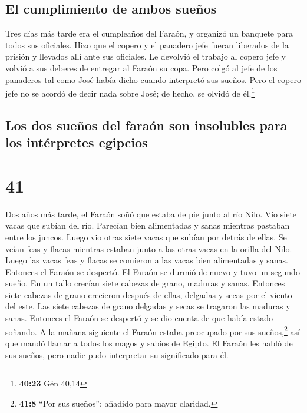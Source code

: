 \hypertarget{el-cumplimiento-de-ambos-sueuxf1os}{%
\subsection{El cumplimiento de ambos
sueños}\label{el-cumplimiento-de-ambos-sueuxf1os}}

 Tres días más tarde era el cumpleaños del Faraón, y
organizó un banquete para todos sus oficiales. Hizo que el copero y el
panadero jefe fueran liberados de la prisión y llevados allí ante sus
oficiales.  Le devolvió el trabajo al copero jefe y
volvió a sus deberes de entregar al Faraón su copa.  Pero
colgó al jefe de los panaderos tal como José había dicho cuando
interpretó sus sueños.  Pero el copero jefe no se acordó
de decir nada sobre José; de hecho, se olvidó de él.\footnote{\textbf{40:23}
  Gén 40,14}

\hypertarget{los-dos-sueuxf1os-del-farauxf3n-son-insolubles-para-los-intuxe9rpretes-egipcios}{%
\subsection{Los dos sueños del faraón son insolubles para los
intérpretes
egipcios}\label{los-dos-sueuxf1os-del-farauxf3n-son-insolubles-para-los-intuxe9rpretes-egipcios}}

\hypertarget{section-40}{%
\section{41}\label{section-40}}

 Dos años más tarde, el Faraón soñó que estaba de pie
junto al río Nilo.  Vio siete vacas que subían del río.
Parecían bien alimentadas y sanas mientras pastaban entre los juncos.
 Luego vio otras siete vacas que subían por detrás de
ellas. Se veían feas y flacas mientras estaban junto a las otras vacas
en la orilla del Nilo.  Luego las vacas feas y flacas se
comieron a las vacas bien alimentadas y sanas. Entonces el Faraón se
despertó.  El Faraón se durmió de nuevo y tuvo un segundo
sueño. En un tallo crecían siete cabezas de grano, maduras y sanas.
 Entonces siete cabezas de grano crecieron después de
ellas, delgadas y secas por el viento del este.  Las siete
cabezas de grano delgadas y secas se tragaron las maduras y sanas.
Entonces el Faraón se despertó y se dio cuenta de que había estado
soñando.  A la mañana siguiente el Faraón estaba
preocupado por sus sueños,\footnote{\textbf{41:8} ``Por sus sueños'':
  añadido para mayor claridad.} así que mandó llamar a todos los magos y
sabios de Egipto. El Faraón les habló de sus sueños, pero nadie pudo
interpretar su significado para él.

